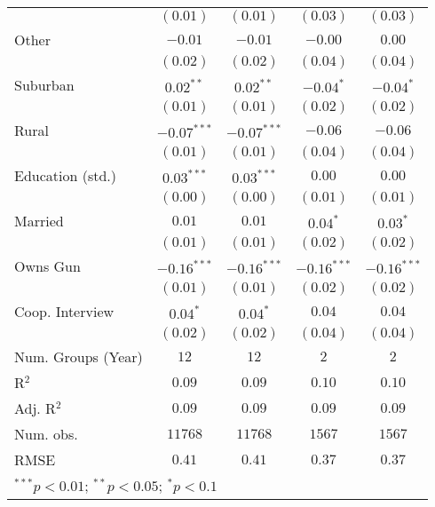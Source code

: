 \begin{table}
\begin{center}
\begin{tabular}{l c c c c}
                        & $(0.01)$      & $(0.01)$      & $(0.03)$      & $(0.03)$      \\
Other                   & $-0.01$       & $-0.01$       & $-0.00$       & $0.00$        \\
                        & $(0.02)$      & $(0.02)$      & $(0.04)$      & $(0.04)$      \\
Suburban                & $0.02^{**}$   & $0.02^{**}$   & $-0.04^{*}$   & $-0.04^{*}$   \\
                        & $(0.01)$      & $(0.01)$      & $(0.02)$      & $(0.02)$      \\
Rural                   & $-0.07^{***}$ & $-0.07^{***}$ & $-0.06$       & $-0.06$       \\
                        & $(0.01)$      & $(0.01)$      & $(0.04)$      & $(0.04)$      \\
Education (std.)        & $0.03^{***}$  & $0.03^{***}$  & $0.00$        & $0.00$        \\
                        & $(0.00)$      & $(0.00)$      & $(0.01)$      & $(0.01)$      \\
Married                 & $0.01$        & $0.01$        & $0.04^{*}$    & $0.03^{*}$    \\
                        & $(0.01)$      & $(0.01)$      & $(0.02)$      & $(0.02)$      \\
Owns Gun                & $-0.16^{***}$ & $-0.16^{***}$ & $-0.16^{***}$ & $-0.16^{***}$ \\
                        & $(0.01)$      & $(0.01)$      & $(0.02)$      & $(0.02)$      \\
Coop. Interview         & $0.04^{*}$    & $0.04^{*}$    & $0.04$        & $0.04$        \\
                        & $(0.02)$      & $(0.02)$      & $(0.04)$      & $(0.04)$      \\
\midrule
Num. Groups (Year)      & $12$          & $12$          & $2$           & $2$           \\
R$^2$                   & $0.09$        & $0.09$        & $0.10$        & $0.10$        \\
Adj. R$^2$              & $0.09$        & $0.09$        & $0.09$        & $0.09$        \\
Num. obs.               & $11768$       & $11768$       & $1567$        & $1567$        \\
RMSE                    & $0.41$        & $0.41$        & $0.37$        & $0.37$        \\
\bottomrule
\multicolumn{5}{l}{\scriptsize{$^{***}p<0.01$; $^{**}p<0.05$; $^{*}p<0.1$}}
\end{tabular}
\label{table_school_alt_treat}
\end{center}
\end{table}
